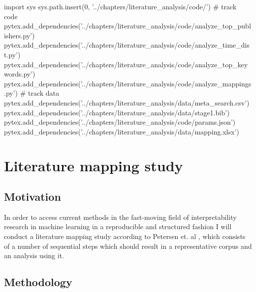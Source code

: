 % 
\begin{pycode}
import sys
sys.path.insert(0, '../chapters/literature_analysis/code/')
# track code
pytex.add_dependencies('../chapters/literature_analysis/code/analyze_top_publishers.py')
pytex.add_dependencies('../chapters/literature_analysis/code/analyze_time_dist.py')
pytex.add_dependencies('../chapters/literature_analysis/code/analyze_top_keywords.py')
pytex.add_dependencies('../chapters/literature_analysis/code/analyze_mappings.py')
# track data
pytex.add_dependencies('../chapters/literature_analysis/data/meta_search.csv')
pytex.add_dependencies('../chapters/literature_analysis/data/stage1.bib')
pytex.add_dependencies('../chapters/literature_analysis/code/params.json')
pytex.add_dependencies('../chapters/literature_analysis/data/mapping.xlsx')
\end{pycode}

\chapter{Literature mapping study}
\label{chap:literature_analysis}

\section{Motivation}

In order to access current methods in the fast-moving field of interpretability research in machine learning in a reproducible and structured fashion I will conduct a literature mapping study according to Petersen et. al \cite{petersenSystematicMappingStudies}, which consists of a number of sequential steps which should result in a representative corpus and an analysis using it.

\section{Methodology}

